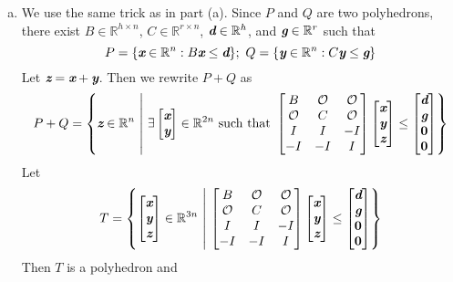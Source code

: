 \begin{enumerate}
\begin{enumerate}[(a)]
		\item We use the same trick as in part (a). Since $P$ and $Q$ are two polyhedrons, there exist $B\in \mathbb{R}^{h\times n}$, $C\in \mathbb{R}^{r\times n}$, $\textit{\textbf{d}} \in \mathbb{R}^h$, and $\textit{\textbf{g}} \in \mathbb{R}^r$  such that 
		\[
		P =\{\textit{\textbf{x}} \in \mathbb{R}^n: B\textit{\textbf{x}} \le \textit{\textbf{d}} \};~Q =\{\textit{\textbf{y}} \in \mathbb{R}^n: C\textit{\textbf{y}} \le \textit{\textbf{g}} \}
		\]
		Let $\textit{\textbf{z}} = \textit{\textbf{x}} + \textit{\textbf{y}}$. Then we rewrite $P+Q$ as 
		\[
		P+Q = \left\{ \textit{\textbf{z}} \in \mathbb{R}^n ~\middle |~ \exists \begin{bmatrix}
		\textit{\textbf{x}}\\\textit{\textbf{y}}
		\end{bmatrix}\in \mathbb{R}^{2n} \text{ such that }\begin{bmatrix}
		B & \mathcal{O} & \mathcal{O}\\
		\mathcal{O} & C & \mathcal{O}\\
		I & I & - I \\
		-I & -I & I  
		\end{bmatrix} \begin{bmatrix}
		\textit{\textbf{x}} \\ \textit{\textbf{y}} \\ \textit{\textbf{z}}
		\end{bmatrix} \le \begin{bmatrix}
		\textit{\textbf{d}} \\ \textit{\textbf{g}} \\ \textbf{0}\\\textbf{0} 
		\end{bmatrix} \right\}
		\]
		Let \[
		T = \left\{ \begin{bmatrix}
		\textit{\textbf{x}} \\ \textit{\textbf{y}} \\ \textit{\textbf{z}}
		\end{bmatrix} \in \mathbb{R}^{3n} ~\middle |~ \begin{bmatrix}
		B & \mathcal{O} & \mathcal{O}\\
		\mathcal{O} & C & \mathcal{O}\\
		I & I & - I \\
		-I & -I & I  
		\end{bmatrix} \begin{bmatrix}
		\textit{\textbf{x}} \\ \textit{\textbf{y}} \\ \textit{\textbf{z}}
		\end{bmatrix} \le \begin{bmatrix}
		\textit{\textbf{d}} \\ \textit{\textbf{g}} \\ \textbf{0}\\\textbf{0} 
		\end{bmatrix} \right\}
		\]
		Then $T$ is a polyhedron and \[
\]
\end{enumerate}
\end{enumerate}
